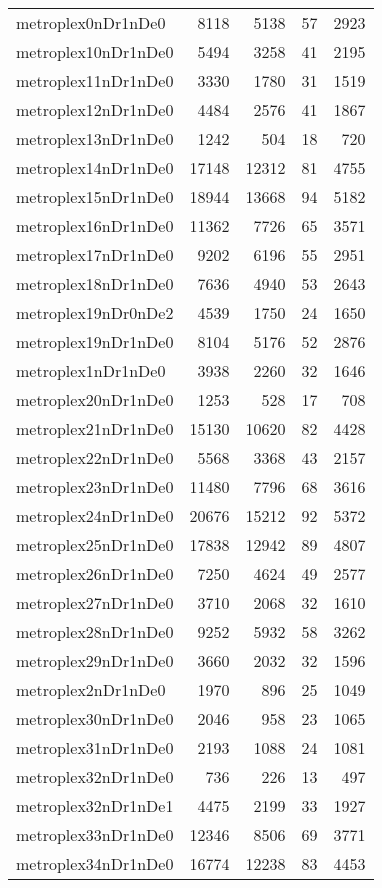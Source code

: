 \begin{longtable}{lrrrr}
metroplex0nDr1nDe0 & 8118 & 5138 & 57 & 2923 \\
metroplex10nDr1nDe0 & 5494 & 3258 & 41 & 2195 \\
metroplex11nDr1nDe0 & 3330 & 1780 & 31 & 1519 \\
metroplex12nDr1nDe0 & 4484 & 2576 & 41 & 1867 \\
metroplex13nDr1nDe0 & 1242 & 504 & 18 & 720 \\
metroplex14nDr1nDe0 & 17148 & 12312 & 81 & 4755 \\
metroplex15nDr1nDe0 & 18944 & 13668 & 94 & 5182 \\
metroplex16nDr1nDe0 & 11362 & 7726 & 65 & 3571 \\
metroplex17nDr1nDe0 & 9202 & 6196 & 55 & 2951 \\
metroplex18nDr1nDe0 & 7636 & 4940 & 53 & 2643 \\
metroplex19nDr0nDe2 & 4539 & 1750 & 24 & 1650 \\
metroplex19nDr1nDe0 & 8104 & 5176 & 52 & 2876 \\
metroplex1nDr1nDe0 & 3938 & 2260 & 32 & 1646 \\
metroplex20nDr1nDe0 & 1253 & 528 & 17 & 708 \\
metroplex21nDr1nDe0 & 15130 & 10620 & 82 & 4428 \\
metroplex22nDr1nDe0 & 5568 & 3368 & 43 & 2157 \\
metroplex23nDr1nDe0 & 11480 & 7796 & 68 & 3616 \\
metroplex24nDr1nDe0 & 20676 & 15212 & 92 & 5372 \\
metroplex25nDr1nDe0 & 17838 & 12942 & 89 & 4807 \\
metroplex26nDr1nDe0 & 7250 & 4624 & 49 & 2577 \\
metroplex27nDr1nDe0 & 3710 & 2068 & 32 & 1610 \\
metroplex28nDr1nDe0 & 9252 & 5932 & 58 & 3262 \\
metroplex29nDr1nDe0 & 3660 & 2032 & 32 & 1596 \\
metroplex2nDr1nDe0 & 1970 & 896 & 25 & 1049 \\
metroplex30nDr1nDe0 & 2046 & 958 & 23 & 1065 \\
metroplex31nDr1nDe0 & 2193 & 1088 & 24 & 1081 \\
metroplex32nDr1nDe0 & 736 & 226 & 13 & 497 \\
metroplex32nDr1nDe1 & 4475 & 2199 & 33 & 1927 \\
metroplex33nDr1nDe0 & 12346 & 8506 & 69 & 3771 \\
metroplex34nDr1nDe0 & 16774 & 12238 & 83 & 4453 \\

\end{longtable}
